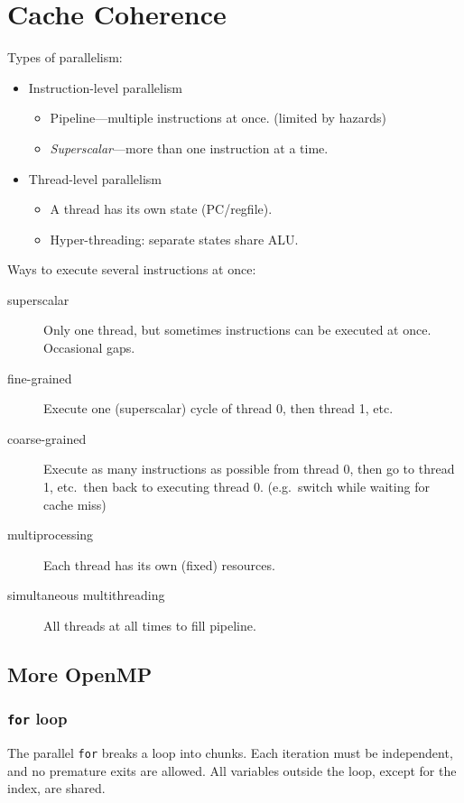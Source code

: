 \chapter{Cache Coherence}
Types of parallelism:
\begin{itemize}
	\item Instruction-level parallelism
	\begin{itemize}
		\item Pipeline---multiple instructions at once. (limited by hazards)
		\item \emph{Superscalar}---more than one instruction at a time.
	\end{itemize}
	\item Thread-level parallelism
	\begin{itemize}
		\item A thread has its own state (PC/regfile).
		\item Hyper-threading: separate states share ALU.
	\end{itemize}
\end{itemize}
Ways to execute several instructions at once:
\begin{description}
	\item[superscalar] Only one thread, but sometimes instructions can be executed at once. Occasional gaps.
	\item[fine-grained] Execute one (superscalar) cycle of thread 0, then thread 1, etc.
	\item[coarse-grained] Execute as many instructions as possible from thread 0, then go to thread 1, etc.~then back to executing thread 0. (e.g.~switch while waiting for cache miss)
	\item[multiprocessing] Each thread has its own (fixed) resources.
	\item[simultaneous multithreading] All threads at all times to fill pipeline.
\end{description}

\section{More OpenMP}
\subsection{\texttt{for} loop}
The parallel \texttt{for} breaks a loop into chunks. Each iteration must be independent, and no premature exits are allowed. All variables outside the loop, except for the index, are shared.

